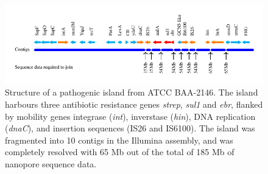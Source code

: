 \begin{figure}[ht]
\centering
\includegraphics[width=\linewidth]{npscarf/figures/figure3.pdf}
\caption[Structure of a pathogenic island from \kp{}
ATCC BAA-2146]
{Structure of a pathogenic island from \kp{} ATCC BAA-2146. The island harbours three antibiotic resistance genes \emph{strep}, \emph{sul1} and \emph{ebr}, flanked by mobility genes integrase (\emph{int}), inverstase (\emph{hin}), DNA replication (\emph{dnaC}), and insertion sequences (IS26 and IS6100). The island was fragmented into 10 contigs in the Illumina assembly, and was completely resolved with 65 Mb out of the total of 185 Mb of nanopore sequence data.}
\label{F:gi}
\end{figure}


